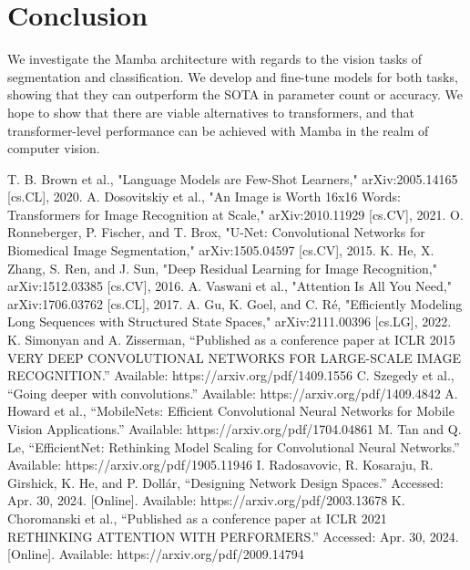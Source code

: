 \documentclass[conference]{IEEEtran}
\begin{document}
\section{Conclusion}
We investigate the Mamba architecture with regards to the vision tasks of segmentation and classification. We develop and fine-tune models for both tasks, showing that they can outperform the SOTA in parameter count or accuracy. We hope to show that there are viable alternatives to transformers, and that 
transformer-level performance can be achieved with Mamba in the realm of computer vision.


\begin{thebibliography}{00}
     T. B. Brown et al., "Language Models are Few-Shot Learners," arXiv:2005.14165 [cs.CL], 2020.
     A. Dosovitskiy et al., "An Image is Worth 16x16 Words: Transformers for Image Recognition at Scale," arXiv:2010.11929 [cs.CV], 2021.
     O. Ronneberger, P. Fischer, and T. Brox, "U-Net: Convolutional Networks for Biomedical Image Segmentation," arXiv:1505.04597 [cs.CV], 2015.
     K. He, X. Zhang, S. Ren, and J. Sun, "Deep Residual Learning for Image Recognition," arXiv:1512.03385 [cs.CV], 2016.
     A. Vaswani et al., "Attention Is All You Need," arXiv:1706.03762 [cs.CL], 2017.
     A. Gu, K. Goel, and C. Ré, "Efficiently Modeling Long Sequences with Structured State Spaces," arXiv:2111.00396 [cs.LG], 2022.
     K. Simonyan and A. Zisserman, “Published as a conference paper at ICLR 2015 VERY DEEP CONVOLUTIONAL NETWORKS FOR LARGE-SCALE IMAGE RECOGNITION.” Available: https://arxiv.org/pdf/1409.1556
     C. Szegedy et al., “Going deeper with convolutions.” Available: https://arxiv.org/pdf/1409.4842
     A. Howard et al., “MobileNets: Efficient Convolutional Neural Networks for Mobile Vision Applications.” Available: https://arxiv.org/pdf/1704.04861
     M. Tan and Q. Le, “EfficientNet: Rethinking Model Scaling for Convolutional Neural Networks.” Available: https://arxiv.org/pdf/1905.11946
     I. Radosavovic, R. Kosaraju, R. Girshick, K. He, and P. Dollár, “Designing Network Design Spaces.” Accessed: Apr. 30, 2024. [Online]. Available: https://arxiv.org/pdf/2003.13678
     K. Choromanski et al., “Published as a conference paper at ICLR 2021 RETHINKING ATTENTION WITH PERFORMERS.” Accessed: Apr. 30, 2024. [Online]. Available: https://arxiv.org/pdf/2009.14794

\end{thebibliography}
\end{document}
